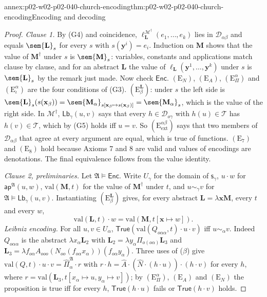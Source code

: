 \begin{annexitem}{annex:p02-w02-p02-040-church-encoding}{thm:p02-w02-p02-040-church-encoding}{Encoding and decoding}
\begin{proof}
\emph{Clause 1.}  By (G4) and coincidence,
\(\ell_{\mathbf L}^{\mathcal M^\dagger}(e_1,\ldots,e_k)\) lies in
\(\mathcal D_{\alpha\beta}\) and equals \(\sem{\mathbf L}_s\) for every \(s\) with
\(s(\mathbf y^i)=e_i\).  Induction on \(\mathbf M\) shows that the value of
\(\mathbf M^\dagger\) under \(s\) is \(\sem{\mathbf M}_s\): variables, constants
and applications match clause by clause, and for an abstract \(\mathbf L\)
the value of \(\ell_{\mathbf L}(\mathbf y^1,\ldots,\mathbf y^k)\) under \(s\) is
\(\sem{\mathbf L}_s\) by the remark just made.  Now check \(\mathsf{Enc}\).
\((\mathrm E_N)\), \((\mathrm E_A)\), \((\mathrm E_\Pi^\alpha)\) and
\((\mathrm E_\iota^\alpha)\) are the four conditions of (G3).
\((\mathrm E_\beta^{\mathbf L})\): under \(s\) the left side is
\(\sem{\mathbf L}_s(s(\mathbf x_\beta))=\sem{\mathbf M_\alpha}_{s[\mathbf x_\beta\mapsto s(\mathbf x_\beta)]}=\sem{\mathbf M_\alpha}_s\),
which is the value of the right side.  In \(\mathcal M^\dagger\),
\(\mathsf{Lb}_\gamma(u,v)\) says that every \(h\in\mathcal D_{o\gamma}\) with
\(h(u)\in\mathcal T\) has \(h(v)\in\mathcal T\), which by (G5) holds iff \(u=v\).
So \((\mathrm E_{\mathrm{ext}}^{\alpha\beta})\) says that two members of
\(\mathcal D_{\alpha\beta}\) that agree at every argument are equal, which is
true of functions.  \((\mathrm E_7)\) and \((\mathrm E_8)\) hold because Axioms 7
and 8 are valid and values of encodings are denotations.  The final
equivalence follows from the value identity.

\emph{Clause 2, preliminaries.}  Let \(\mathfrak A\models\mathsf{Enc}\).  Write
\(U_\gamma\) for the domain of \(\mathsf s_\gamma\), \(u\cdot w\) for
\(\mathsf{ap}^{\mathfrak A}(u,w)\), \(\mathrm{val}(\mathbf M,t)\) for the value
of \(\mathbf M^\dagger\) under \(t\), and \(u\sim_\gamma v\) for
\(\mathfrak A\models\mathsf{Lb}_\gamma(u,v)\).  Instantiating
\((\mathrm E_\beta^{\mathbf L})\) gives, for every abstract
\(\mathbf L=\lambda\mathbf x\mathbf M\), every \(t\) and every \(w\),
\begin{equation}
 \mathrm{val}(\mathbf L,t)\cdot w=\mathrm{val}(\mathbf M,t[\mathbf x\mapsto w]).
 \tag{\(\beta\)}
\end{equation}
\emph{Leibniz encoding.}  For all \(u,v\in U_\alpha\),
\(\mathsf{True}(\mathrm{val}(Q_{o\alpha\alpha},t)\cdot u\cdot v)\) iff
\(u\sim_\alpha v\).  Indeed \(Q_{o\alpha\alpha}\) is the abstract
\(\lambda x_\alpha\mathbf L_2\) with
\(\mathbf L_2=\lambda y_\alpha\Pi_{o(o\alpha)}\mathbf L_3\) and
\(\mathbf L_3=\lambda f_{o\alpha}A_{ooo}(N_{oo}(f_{o\alpha}x_\alpha))(f_{o\alpha}y_\alpha)\).
Three uses of (\(\beta\)) give
\(\mathrm{val}(Q,t)\cdot u\cdot v=\widehat\Pi^{\mathfrak A}_\alpha\cdot r\) with
\(r\cdot h=\widehat A\cdot(\widehat N\cdot(h\cdot u))\cdot(h\cdot v)\) for every
\(h\), where \(r=\mathrm{val}(\mathbf L_3,t[x_\alpha\mapsto u,y_\alpha\mapsto v])\);
by \((\mathrm E_\Pi^\alpha)\), \((\mathrm E_A)\) and \((\mathrm E_N)\) the
proposition is true iff for every \(h\), \(\mathsf{True}(h\cdot u)\) fails or
\(\mathsf{True}(h\cdot v)\) holds.


\end{proof}
\end{annexitem}
